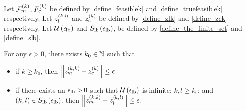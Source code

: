 \begin{theorem}
\label{bounded_projection_theorem}

Let ${\mathcal F_m^{(k)}}$, ${F_c^{(k)}}$ be defined by \cref{define_feasiblek} and \cref{define_truefeasiblek} respectively.
Let ${z_l^{(k, l)}}$ and ${z_c^{(k)}}$ be defined by \cref{define_zlk} and \cref{define_zck} respectively.
Let ${\mathcal U\left(\epsilon_{\textrm{lb}}\right)}$ and ${S_{\textrm{lb}}\left(\epsilon_{\textrm{lb}}\right)}$, be defined by \cref{define_the_finite_set} and \cref{define_slb}.




For any $\epsilon > 0$, there exists $k_0 \in \mathbb N$ such that
\begin{itemize}
\item if $k \ge k_0$, then
$
\left\|{z_m^{(k, k)}} - {z_c^{(k)}}\right\| \le \epsilon
$
\item if there exists an ${\epsilon_{\textrm{lb}}} > 0$ such that ${\mathcal U\left(\epsilon_{\textrm{lb}}\right)}$ is infinite; $k, l \ge k_0$; and $(k, l) \in {S_{\textrm{lb}}\left(\epsilon_{\textrm{lb}}\right)}$, then 
$
\left\|{z_m^{(k, k)}} - {z_l^{(k, l)}}\right\| \le \epsilon.
$
\end{itemize}
\end{theorem}
